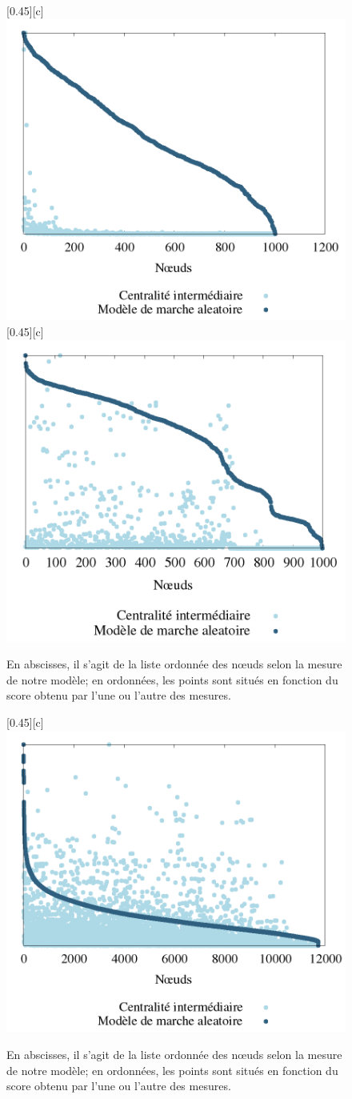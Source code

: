 \documentclass{beamer}
\begin{document}
\begin{frame}
    \begin{figure}[htbp]
		\centering
		[0.45\linewidth][c]{
			\includegraphics[width=0.45\linewidth]{./img/marche_aleatoire_dorogovstev_mendes.png}
		}
		\hfill
		[0.45\linewidth][c]{
			\includegraphics[width=0.45\linewidth]{./img/marche_aleatoire_small_world_1000_2_0_5.png}
		}
		\caption{En abscisses, il s'agit de la liste ordonnée des n\oe uds selon la mesure de notre modèle; en ordonnées, les points sont situés en fonction du score obtenu par l'une ou l'autre des mesures.}
		\label{fig:graphiques_random_walk_1}
	\end{figure}
\end{frame}

\begin{frame}
    \begin{figure}[htbp]
		\centering
		[0.45\linewidth][c]{
			\includegraphics[width=0.45\linewidth]{./img/marche_aleatoire_le_havre.png}
		}
		\caption{En abscisses, il s'agit de la liste ordonnée des n\oe uds selon la mesure de notre modèle; en ordonnées, les points sont situés en fonction du score obtenu par l'une ou l'autre des mesures.}
		\label{fig:graphiques_random_walk_2}
	\end{figure}
\end{frame}
\end{document}
